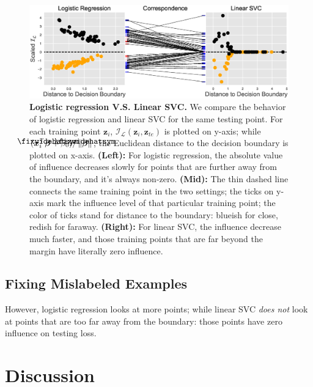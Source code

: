 \documentclass{article}
\newcommand\lowerwidehatsym{%
  \text{\smash{\raisebox{-1.3ex}{%
    $\fixwidehatsym$}}}}
\newcommand\fixwidehat[1]{%
  \mathchoice
    {\accentset{\displaystyle\lowerwidehatsym}{#1}}
    {\accentset{\textstyle\lowerwidehatsym}{#1}}
    {\accentset{\scriptstyle\lowerwidehatsym}{#1}}
    {\accentset{\scriptscriptstyle\lowerwidehatsym}{#1}}
}
\begin{document}
\setcounter{figure}{4}
\begin{figure}[h]
\vskip 0.0in
\begin{center}
\centerline{\includegraphics[width=\columnwidth]{fig-app1}}
\vskip -0.1in
\caption{\textbf{Logistic regression V.S. Linear SVC.} We compare the behavior of logistic regression and linear SVC for the same testing point. For each training point $\bm{z}_{i}$, $\mathcal{I}_{\mathcal{L}}(\bm{z}_{i}, \bm{z}_{te})$ is plotted on y-axis; while $ (\bm{x}_{i}^{\top}\fixwidehat{\bm{\beta}}+\beta_0) / \left\lVert \fixwidehat{\bm{\beta}}\right\rVert$, the Euclidean distance to the decision boundary is plotted on x-axis. \textbf{(Left):} For logistic regression, the absolute value of influence decreases slowly for points that are further away from the boundary, and it's always non-zero. \textbf{(Mid):} The thin dashed line connects the same training point in the two settings; the ticks on y-axis mark the influence level of that particular training point; the color of ticks stand for distance to the boundary: blueish for close, redish for faraway. \textbf{(Right):} For linear SVC, the influence decrease much faster, and those training points that are far beyond the margin have literally zero influence.} 
\label{model_behav_fig}
\end{center}
\vskip 0in
\end{figure}

\subsection{Fixing Mislabeled Examples}
However, logistic regression looks at more points; while linear SVC \emph{does not} look at points that are too far away from the boundary: those points have zero influence on testing loss.

\section{Discussion}
\end{document}
